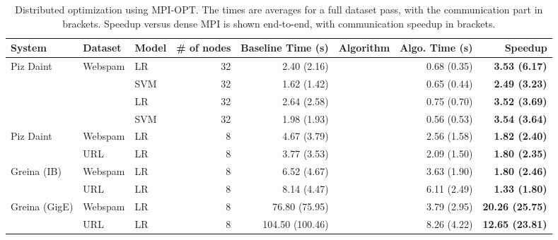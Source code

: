 \documentclass{article}
\begin{document}
\begin{table}[htbp]
	\begin{footnotesize}
		\centering
		\begin{tabular}{ @{} l | l | l | r | r | l | r | r @{} }
			\toprule
			System & Dataset & Model & \# of nodes & Baseline Time (s) & Algorithm & Algo. Time (s) & Speedup \\
			\midrule
			\multirow{ 3}{*}{Piz Daint} & \multirow{ 3}{*}{Webspam} & LR & 32 & 2.40 (2.16) & \multirow{ 3}{*}{\ssarone} & 0.68 (0.35) & \textbf{3.53 (6.17)} \\
			&  & SVM & 32 & 1.62 (1.42) & & 0.65 (0.44) & \textbf{2.49 (3.23)} \\
			\midrule
			\multirow{ 3}{*}{Piz Daint}& \multirow{ 3}{*}{URL} & LR & 32 & 2.64 (2.58) & \multirow{ 3}{*}{\ssarone} & 0.75 (0.70) & \textbf{3.52 (3.69)} \\
			&  & SVM & 32 & 1.98 (1.93) &  & 0.56 (0.53) & \textbf{3.54 (3.64)} \\
			\midrule
			\multirow{ 2}{*}{Piz Daint}& Webspam & LR & 8 & 4.67 (3.79) & \multirow{ 2}{*}{\ssartwo} & 2.56 (1.58) & \textbf{1.82 (2.40)} \\
			& URL & LR & 8 & 3.77 (3.53) & & 2.09 (1.50) & \textbf{ 1.80 (2.35)} \\
			\midrule
			\multirow{ 2}{*}{Greina (IB)} & Webspam & LR & 8 & 6.52 (4.67) & \multirow{ 2}{*}{\ssartwo} & 3.63 (1.90) & \textbf{1.80 (2.46)} \\
			& URL & LR & 8 & 8.14 (4.47) & & 6.11 (2.49) & \textbf{1.33 (1.80)} \\
			\midrule
			\multirow{ 2}{*}{Greina (GigE)} & Webspam & LR & 8 & 76.80 (75.95) & \multirow{ 2}{*}{\ssartwo} & 3.79 (2.95) & \textbf{20.26 (25.75)} \\
			& URL & LR & 8 & 104.50 (100.46) & & 8.26 (4.22) & \textbf{12.65 (23.81)} \\
			\bottomrule
		\end{tabular}
		\caption{Distributed optimization using MPI-OPT. The times are averages for a full dataset pass, with the communication part in brackets. Speedup versus dense MPI is shown end-to-end, with communication speedup in brackets.}
		\label{tbl:ResutlsMpiOpt}
	\end{footnotesize}

\end{table}
\end{document}
